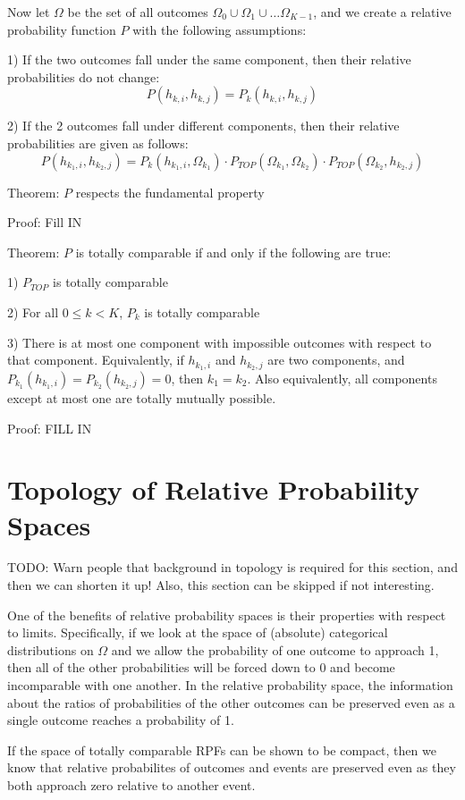\documentclass[twoside]{article}
\begin{document}
Now let \(\Omega\) be the set of all outcomes \(\Omega_0 \cup \Omega_1 \cup \dots \Omega_{K-1}\), and we create a relative probability function \(P\) with the following assumptions:

1) If the two outcomes fall under the same component, then their relative probabilities do not change:
\[P(h_{k, i}, h_{k, j}) = P_k(h_{k, i}, h_{k, j})\]

2) If the 2 outcomes fall under different components, then their relative probabilities are given as follows:
\[P(h_{k_1, i}, h_{k_2, j}) = P_k(h_{k_1, i}, \Omega_{k_1}) \cdot  P_{TOP}(\Omega_{k_1}, \Omega_{k_2}) \cdot P_{TOP}(\Omega_{k_2}, h_{k_2, j})\]

Theorem: \(P\) respects the fundamental property

Proof: Fill IN

Theorem: \(P\) is totally comparable if and only if the following are true:

1) \(P_{TOP}\) is totally comparable

2) For all \(0 \leq k < K\), \(P_k\) is totally comparable

3) There is at most one component with impossible outcomes with respect to that component. Equivalently, if \(h_{k_1, i}\) and \(h_{k_2, j}\) are two components, and \(P_{k_1}(h_{k_1, i}) = P_{k_2}(h_{k_2, j}) = 0\), then \(k_1 = k_2\). Also equivalently, all components except at most one are totally mutually possible.

Proof: FILL IN

\section{Topology of Relative Probability Spaces}

TODO: Warn people that background in topology is required for this section, and then we can shorten it up! Also, this section can be skipped if not interesting.

One of the benefits of relative probability spaces is their properties with respect to limits. Specifically, if we look at the space of (absolute) categorical distributions on \(\Omega\) and we allow the probability of one outcome to approach 1, then all of the other probabilities will be forced down to 0 and become incomparable with one another. In the relative probability space, the information about the ratios of probabilities of the other outcomes can be preserved even as a single outcome reaches a probability of 1.

If the space of totally comparable RPFs can be shown to be compact, then we know that relative probabilites of outcomes and events are preserved even as they both approach zero relative to another event.
\end{document}
